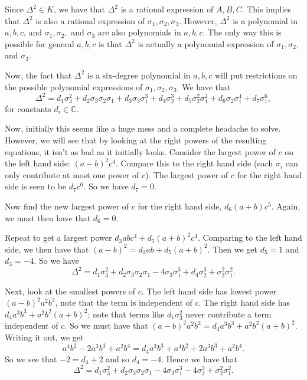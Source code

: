 Since \(\Delta^2 \in K\), we have that \(\Delta^2\) is a rational expression of \(A, B, C\). This implies
that \(\Delta^2\) is also a rational expression of \(\sigma_1, \sigma_2, \sigma_3\). However, \(\Delta^2\)
is a polynomial in \(a, b, c\), and \(\sigma_1, \sigma_2,\) and \(\sigma_3\) are also polynomials in
\(a, b, c\). The only way this is possible for general \(a, b, c\) is that \(\Delta^2\) is
actually a polynomial expression of \(\sigma_1, \sigma_2,\) and \(\sigma_3\).

Now, the fact that \(\Delta^2\) is a six-degree polynomial in \(a, b, c\) will put restrictions on the 
possible polynomial expressions of \(\sigma_1, \sigma_2, \sigma_3\). We have that
\begin{equation}
\Delta^2 = d_1 \sigma_3^2 + d_2 \sigma_3 \sigma_2 \sigma_1 + d_3 \sigma_3 \sigma_1^3
    + d_4 \sigma_2^3 + d_5 \sigma_2^2 \sigma_1^2 + d_6 \sigma_2 \sigma_1^4 + d_7 \sigma_1^6,
\end{equation}
for constants \(d_i \in \mathbb C\).

Now, initially this seems like a huge mess and a complete headache to solve. However, we will see that by looking
at the right powers of the resulting equations, it isn't as bad as it initially looks.
Consider the largest power of \(c\) on the left hand side: \((a-b)^2 c^4\). Compare this to the right
hand side (each \(\sigma_i\) can only contribute at most one power of \(c\)).
The largest power of \(c\) for the right hand side is seen to be \(d_7 c^6\). So we have \(d_7 = 0\).

Now find the new largest power of \(c\) for the right hand side, \(d_6 (a + b)c^5\). Again, we must then
have that \(d_6 = 0\).

Repeat to get a largest power \(d_3 abc^4 + d_5 (a + b)^2 c^4\). Comparing to the left
hand side, we then have that \((a - b)^2 = d_3 ab + d_5 (a + b)^2\). Then we get \(d_5 = 1\)
and \(d_3 = -4\).
So we have
\begin{equation}
\Delta^2 = d_1 \sigma_3^2 + d_2 \sigma_3 \sigma_2 \sigma_1 
    - 4 \sigma_3 \sigma_1^3 + d_4 \sigma_2^3 + \sigma_2^2 \sigma_1^2.
\end{equation}

Next, look at the smallest powers of \(c\). The left hand side has lowest power \((a-b)^2a^2b^2\), note
that the term is independent of \(c\). The right hand side has \(d_4 a^3b^3 + a^2b^2(a + b)^2\); note that
terms like \(d_1 \sigma_3^2\) never contribute a term independent of \(c\). So we
must have that \((a-b)^2a^2b^2 = d_4 a^3b^3 + a^2b^2(a + b)^2\). Writing it out, we get
\begin{equation}
a^4b^2 - 2a^3b^3 + a^2b^4 = d_4 a^3b^3 + a^4b^2 + 2a^3b^3 + a^2b^4.
\end{equation}
So we see that \(-2 = d_4 + 2\) and so \(d_4 = -4\). Hence we have that
\begin{equation}
\Delta^2 = d_1 \sigma_3^2 + d_2 \sigma_3 \sigma_2 \sigma_1 
    - 4 \sigma_3 \sigma_1^3 - 4 \sigma_2^3 + \sigma_2^2 \sigma_1^2.
\end{equation}

